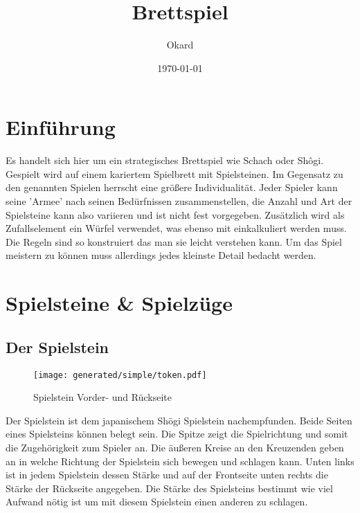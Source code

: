 \documentclass{article}
\title{Brettspiel}
\author{Okard}
\date{\today}
\begin{document}
\maketitle
\tableofcontents
\newpage

\section{Einführung}
	Es handelt sich hier um ein strategisches Brettspiel wie Schach oder Shôgi.
	Gespielt wird auf einem kariertem Spielbrett mit Spielsteinen.
	Im Gegensatz zu den genannten Spielen herrscht eine größere Individualität.
	Jeder Spieler kann seine 'Armee' nach seinen Bedürfnissen zusammenstellen, die
	Anzahl und Art der Spielsteine kann also variieren und ist nicht fest vorgegeben.
	Zusätzlich wird als Zufallselement ein Würfel verwendet, was ebenso mit einkalkuliert 
	werden muss.
	Die Regeln sind so konstruiert das man sie leicht verstehen kann. Um das Spiel meistern
	zu können muss allerdings jedes kleinste Detail bedacht werden.
	
	
	


\section{Spielsteine \& Spielzüge}

\subsection{Der Spielstein}
		
	\begin{wrapfigure}{l}{5cm}
	\centering
	\texttt{[image: generated/simple/token.pdf]}
	\caption{Spielstein Vorder- und Rückseite}
	\end{wrapfigure}
	
	Der Spielstein ist dem japanischem Sh\=ogi Spielstein nachempfunden. Beide Seiten eines Spielsteins können belegt sein.
	Die Spitze zeigt die Spielrichtung und somit die Zugehörigkeit zum Spieler an.
	Die äußeren Kreise an den Kreuzenden geben an in welche Richtung der Spielstein sich bewegen und schlagen kann.
	Unten links ist in jedem Spielstein dessen Stärke und auf der Frontseite unten rechts die Stärke der Rückseite angegeben.
	Die Stärke des Spielsteins bestimmt wie viel Aufwand nötig ist um mit diesem Spielstein einen anderen zu schlagen.
	\\
\end{document}
